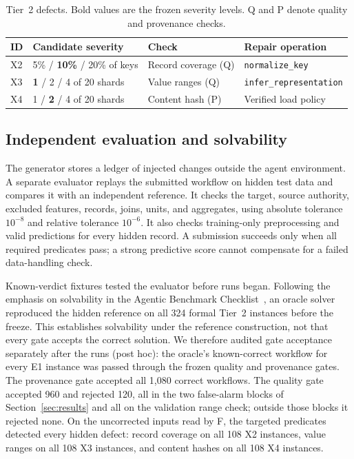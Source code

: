 \documentclass[conference]{IEEEtran}
\newcommand{\sys}[1]{\textsf{#1}}
\newcommand{\code}[1]{\texttt{#1}}
\begin{document}
\begin{table}[t]
\caption{Tier~2 defects. Bold values are the frozen severity levels. Q and P denote quality and provenance checks.}
\label{tab:tier2}
\centering\footnotesize\setlength{\tabcolsep}{3pt}
\begin{tabularx}{\columnwidth}{@{}lp{}p{}Y@{}}
\toprule
ID & Candidate severity & Check & Repair operation \\
\midrule
X2 & 5\% / \textbf{10\%} / 20\% of keys & Record coverage (Q) & \code{\scriptsize normalize\_key} \\
X3 & \textbf{1} / 2 / 4 of 20 shards & Value ranges (Q) & \code{\scriptsize infer\_representation} \\
X4 & 1 / \textbf{2} / 4 of 20 shards & Content hash (P) & Verified load policy \\
\bottomrule
\end{tabularx}
\end{table}

\subsection{Independent evaluation and solvability}
The generator stores a ledger of injected changes outside the agent environment. A separate evaluator replays the submitted workflow on hidden test data and compares it with an independent reference. It checks the target, source authority, excluded features, records, joins, units, and aggregates, using absolute tolerance $10^{-8}$ and relative tolerance $10^{-6}$. It also checks training-only preprocessing and valid predictions for every hidden record. A submission succeeds only when all required predicates pass; a strong predictive score cannot compensate for a failed data-handling check.

Known-verdict fixtures tested the evaluator before runs began. Following the emphasis on solvability in the Agentic Benchmark Checklist~\cite{zhu2025abc}, an oracle solver reproduced the hidden reference on all 324 formal Tier~2 instances before the freeze. This establishes solvability under the reference construction, not that every gate accepts the correct solution. We therefore audited gate acceptance separately after the runs (post hoc): the oracle's known-correct workflow for every E1 instance was passed through the frozen quality and provenance gates. The provenance gate accepted all 1,080 correct workflows. The quality gate accepted 960 and rejected 120, all in the two false-alarm blocks of Section~\ref{sec:results} and all on the validation range check; outside those blocks it rejected none. On the uncorrected inputs read by \sys{F}, the targeted predicates detected every hidden defect: record coverage on all 108 X2 instances, value ranges on all 108 X3 instances, and content hashes on all 108 X4 instances.
\end{document}

